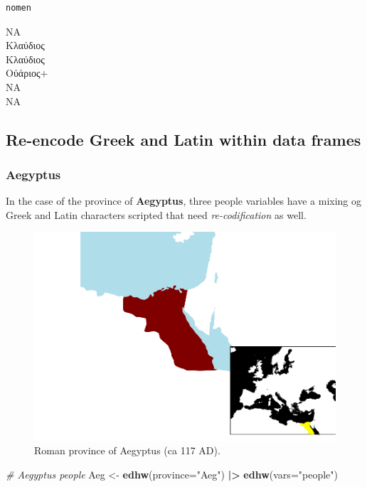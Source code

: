 \documentclass[a4paper,11pt]{memoir}
\newenvironment{Shaded}{\begin{snugshade}}{\end{snugshade}}
\newcommand{\CommentTok}[1]{\textcolor[rgb]{0.56,0.35,0.01}{\textit{#1}}}
\newcommand{\DataTypeTok}[1]{\textcolor[rgb]{0.13,0.29,0.53}{#1}}
\newcommand{\ErrorTok}[1]{\textcolor[rgb]{0.64,0.00,0.00}{\textbf{#1}}}
\newcommand{\KeywordTok}[1]{\textcolor[rgb]{0.13,0.29,0.53}{\textbf{#1}}}
\newcommand{\NormalTok}[1]{#1}
\newcommand{\OperatorTok}[1]{\textcolor[rgb]{0.81,0.36,0.00}{\textbf{#1}}}
\newcommand{\StringTok}[1]{\textcolor[rgb]{0.31,0.60,0.02}{#1}}
\begin{document}
\begin{Shaded}
\end{Shaded}

\begin{verbatim}
nomen
\end{verbatim}

\noindent
NA \\
Κλαύδιος \\
Κλαύδιος \\
Οὐάριος+ \\
NA \\
NA\\


\hypertarget{re-encode-greek-and-latin-within-data-frames}{%
\subsection{Re-encode Greek and Latin within data
frames}\label{re-encode-greek-and-latin-within-data-frames}}

\hypertarget{aegyptus}{%
\subsubsection{Aegyptus}\label{aegyptus}}

In the case of the province of \textbf{Aegyptus}, three people variables
have a mixing og Greek and Latin characters scripted that need
\emph{re-codification} as well.

\begin{figure}[!h]

{\centering \includegraphics[width=0.25\linewidth]{img/unnamed-chunk-33-1} 

}

\caption{Roman province of Aegyptus (ca 117 AD).}\label{fig:unnamed-chunk-33}
\end{figure}

\begin{Shaded}
\begin{Highlighting}[]
\CommentTok{# Aegyptus people}
\NormalTok{Aeg <-}\StringTok{ }\KeywordTok{edhw}\NormalTok{(}\DataTypeTok{province=}\StringTok{"Aeg"}\NormalTok{) }\OperatorTok{|}\ErrorTok{>}\StringTok{ }
\StringTok{  }\KeywordTok{edhw}\NormalTok{(}\DataTypeTok{vars=}\StringTok{"people"}\NormalTok{)}
\end{Highlighting}
\end{Shaded}
\end{document}
